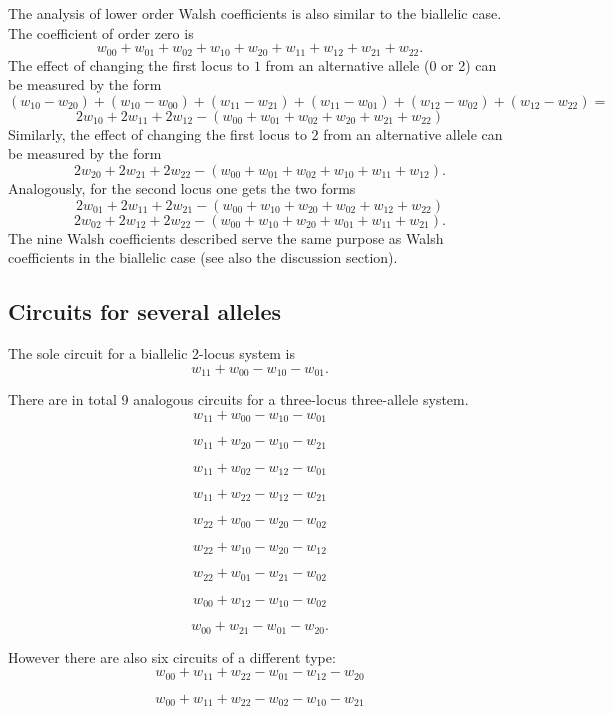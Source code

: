 \documentclass[12pt]{amsart}
\theoremstyle{plain}
\theoremstyle{definition}
\begin{document}
The analysis of lower order  Walsh coefficients is also similar to
the biallelic case. The coefficient of order zero is
\[
w_{00}+w_{01}+w_{02}+w_{10}+w_{20}+w_{11}+w_{12}+w_{21}+w_{22}.
\]
The effect of changing the first locus to $1$ from an alternative allele (0 or 2)
can be measured by the form
\[
(w_{10}-w_{20})+ (w_{10}-w_{00}) + (w_{11}-w_{21} ) + (w_{11}-w_{01})+  (w_{12}-w_{02})+ (w_{12}-w_{22})=
\]
\[
2w_{10}+ 2w_{11}+ 2w_{12} -(w_{00}+w_{01}+w_{02} +w_{20}+w_{21}+ w_{22})
\]
Similarly, the effect of changing the first locus to $2$ from an alternative allele can be measured by the form
\[
2w_{20}+ 2w_{21}+ 2w_{22} -(w_{00}+w_{01}+w_{02} +w_{10}+w_{11}+ w_{12}).
\]
Analogously, for the second locus one gets the two forms
\[
2w_{01}+ 2w_{11}+ 2w_{21} -(w_{00}+w_{10}+w_{20} +w_{02}+w_{12}+ w_{22})
\]
\[
2w_{02}+ 2w_{12}+ 2w_{22} -(w_{00}+w_{10}+w_{20} +w_{01}+w_{11}+ w_{21}).
\]
The nine Walsh coefficients described serve the same purpose as Walsh coefficients
in the biallelic case (see also the discussion section).




\subsection{Circuits for several alleles}

The sole circuit for a biallelic 2-locus system is
\[
w_{11}+w_{00}-w_{10}-w_{01}.
\]

There are in total 9 analogous circuits for a three-locus three-allele
system.
\[
w_{11}+w_{00}-w_{10}-w_{01}
\]

\[
w_{11}+w_{20}-w_{10}-w_{21}
\]

\[
w_{11}+w_{02}-w_{12}-w_{01}
\]

\[
w_{11}+w_{22}-w_{12}-w_{21}
\]


\[
w_{22}+w_{00}-w_{20}-w_{02}
\]

\[
w_{22}+w_{10}-w_{20}-w_{12}
\]

\[
w_{22}+w_{01}-w_{21}-w_{02}
\]


\[
w_{00}+w_{12}-w_{10}-w_{02}
\]


\[
w_{00}+w_{21}-w_{01}-w_{20}.
\]




\smallskip

However there are also six circuits of a different type:
\[
w_{00}+w_{11}+w_{22}-w_{01}-w_{12}-w_{20}
\]

\[
w_{00}+w_{11}+w_{22}-w_{02}-w_{10}-w_{21}
\]
\end{document}

